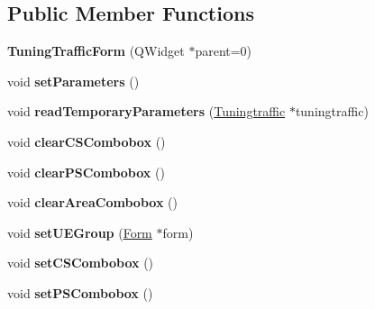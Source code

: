 \subsection*{Public Member Functions}
\begin{DoxyCompactItemize}
\item 
{\bfseries Tuning\+Traffic\+Form} (Q\+Widget $\ast$parent=0)\hypertarget{class_tuning_traffic_form_a8473befa89bad11a706095d609e01c64}{}\label{class_tuning_traffic_form_a8473befa89bad11a706095d609e01c64}

\item 
void {\bfseries set\+Parameters} ()\hypertarget{class_tuning_traffic_form_ad8985a528b484e306ef443f94d4d94de}{}\label{class_tuning_traffic_form_ad8985a528b484e306ef443f94d4d94de}

\item 
void {\bfseries read\+Temporary\+Parameters} (\hyperlink{class_tuningtraffic}{Tuningtraffic} $\ast$tuningtraffic)\hypertarget{class_tuning_traffic_form_a5e8cfa8a2137dc6b2fa120ff9f862f5e}{}\label{class_tuning_traffic_form_a5e8cfa8a2137dc6b2fa120ff9f862f5e}

\item 
void {\bfseries clear\+C\+S\+Combobox} ()\hypertarget{class_tuning_traffic_form_a0415cf1914afc6771c4abe960f155660}{}\label{class_tuning_traffic_form_a0415cf1914afc6771c4abe960f155660}

\item 
void {\bfseries clear\+P\+S\+Combobox} ()\hypertarget{class_tuning_traffic_form_a49bd787ad4bab1390aa49e8442b881d4}{}\label{class_tuning_traffic_form_a49bd787ad4bab1390aa49e8442b881d4}

\item 
void {\bfseries clear\+Area\+Combobox} ()\hypertarget{class_tuning_traffic_form_a04ad642fa26a122852e1f473df63ce81}{}\label{class_tuning_traffic_form_a04ad642fa26a122852e1f473df63ce81}

\item 
void {\bfseries set\+U\+E\+Group} (\hyperlink{class_form}{Form} $\ast$form)\hypertarget{class_tuning_traffic_form_aa6fc853e107c3685faf56b436a161144}{}\label{class_tuning_traffic_form_aa6fc853e107c3685faf56b436a161144}

\item 
void {\bfseries set\+C\+S\+Combobox} ()\hypertarget{class_tuning_traffic_form_ac7d0a3c61d3bf466c0e33e0ea3e8be75}{}\label{class_tuning_traffic_form_ac7d0a3c61d3bf466c0e33e0ea3e8be75}

\item 
void {\bfseries set\+P\+S\+Combobox} ()\hypertarget{class_tuning_traffic_form_a8718518fc9eb36df67806f2773149617}{}\label{class_tuning_traffic_form_a8718518fc9eb36df67806f2773149617}


\end{DoxyCompactItemize}
